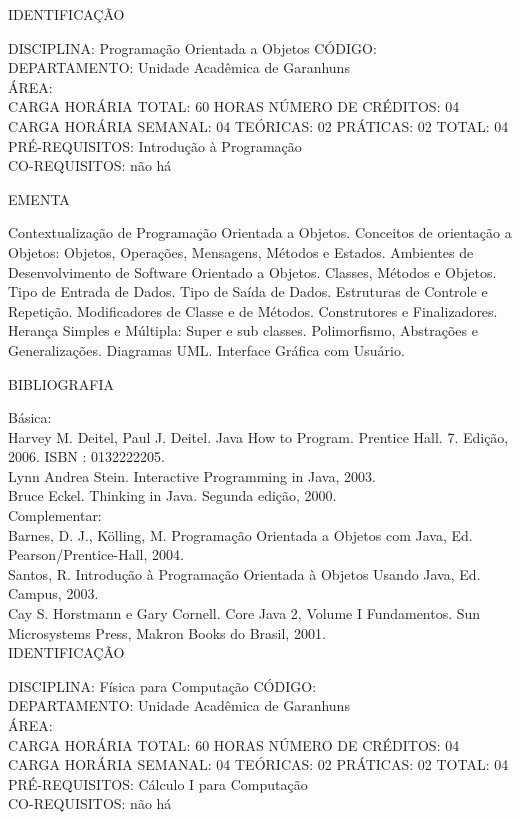 \documentclass[
	12pt,				%
	openright,			%
  oneside,     %
	a4paper,			%
	english,			%
	french,				%
	spanish,			%
	brazil				%
	]{abntex2}
\begin{document}
\begin{apendicesenv}
\newpage IDENTIFICAÇÃO

DISCIPLINA: Programação Orientada a Objetos CÓDIGO:\\ 
DEPARTAMENTO: Unidade Acadêmica de Garanhuns\\
ÁREA: \\
CARGA HORÁRIA TOTAL: 60 HORAS NÚMERO DE CRÉDITOS: 04\\
CARGA HORÁRIA SEMANAL: 04 TEÓRICAS: 02 PRÁTICAS: 02 TOTAL: 04\\
PRÉ-REQUISITOS: Introdução à Programação\\
CO-REQUISITOS: não há

EMENTA 

Contextualização de Programação Orientada a Objetos. Conceitos de
orientação a Objetos: Objetos, Operações, Mensagens, Métodos e Estados.
Ambientes de Desenvolvimento de Software Orientado a Objetos. Classes,
Métodos e Objetos. Tipo de Entrada de Dados. Tipo de Saída de Dados.
Estruturas de Controle e Repetição. Modificadores de Classe e de
Métodos. Construtores e Finalizadores. Herança Simples e Múltipla:
Super e sub classes. Polimorfismo, Abstrações e Generalizações.
Diagramas UML. Interface Gráfica com Usuário.

BIBLIOGRAFIA 

Básica:\\
Harvey M. Deitel, Paul J. Deitel. Java How to Program. Prentice Hall. 7.
Edição, 2006. ISBN : 0132222205.\\
Lynn Andrea Stein. Interactive Programming in Java, 2003.\\
Bruce Eckel. Thinking in Java. Segunda edição, 2000.\\
Complementar:\\
Barnes, D. J., Kölling, M. Programação Orientada a Objetos com Java, Ed.
Pearson/Prentice-Hall, 2004.\\
Santos, R. Introdução à Programação Orientada à Objetos Usando Java, Ed.
Campus, 2003.\\
Cay S. Horstmann e Gary Cornell. Core Java 2, Volume I  Fundamentos.
Sun Microsystems Press, Makron Books do Brasil, 2001.\\


\newpage IDENTIFICAÇÃO

DISCIPLINA: Física para Computação CÓDIGO:\\
DEPARTAMENTO: Unidade Acadêmica de Garanhuns\\ ÁREA: \\
CARGA HORÁRIA TOTAL: 60 HORAS NÚMERO DE CRÉDITOS: 04\\
CARGA HORÁRIA SEMANAL: 04 TEÓRICAS: 02 PRÁTICAS: 02 TOTAL: 04\\
PRÉ-REQUISITOS: Cálculo I para Computação\\
CO-REQUISITOS: não há


\end{apendicesenv}
\end{document}
